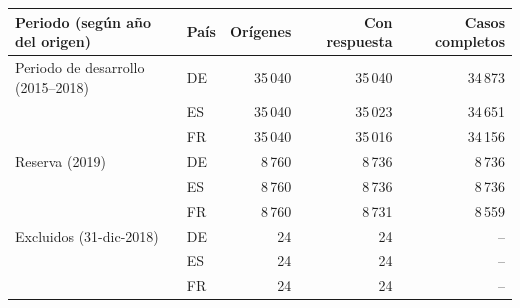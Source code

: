 \begin{tabular}{llrrr}
\toprule
Periodo (según año del origen) & País & Orígenes & Con respuesta & Casos completos \\
\midrule
Periodo de desarrollo (2015--2018) & DE & 35\,040 & 35\,040 & 34\,873 \\
 & ES & 35\,040 & 35\,023 & 34\,651 \\
 & FR & 35\,040 & 35\,016 & 34\,156 \\
\midrule
Reserva (2019) & DE & 8\,760 & 8\,736 & 8\,736 \\
 & ES & 8\,760 & 8\,736 & 8\,736 \\
 & FR & 8\,760 & 8\,731 & 8\,559 \\
\midrule
Excluidos (31-dic-2018) & DE & 24 & 24 & -- \\
 & ES & 24 & 24 & -- \\
 & FR & 24 & 24 & -- \\
\bottomrule
\end{tabular}